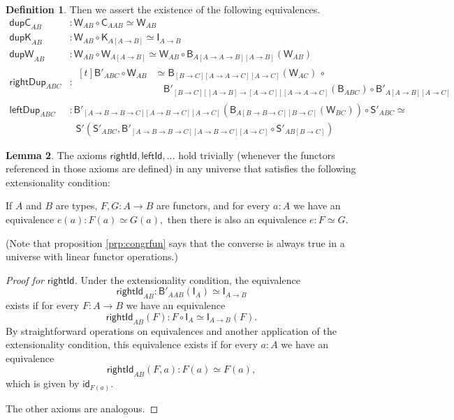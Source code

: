 \documentclass[a4paper]{article}
\theoremstyle{definition}
\newtheorem{definition}{Definition}[section]
\newtheorem{lemma}[definition]{Lemma}
\theoremstyle{remark}
\renewcommand{\equiv}{\simeq}
\newcommand{\nm}{\mathsf}
\newcommand{\id}{\nm{id}}
\newcommand{\combinator}{\nm}
\newcommand{\idFun}{\combinator{I}}
\newcommand{\constFun}{\combinator{K}}
\newcommand{\compFun}{\combinator{B'}}
\newcommand{\revCompFun}{\combinator{B}}
\newcommand{\swapFun}{\combinator{C}}
\newcommand{\dupFun}{\combinator{W}}
\newcommand{\substFun}{\combinator{S'}}
\begin{document}
\begin{definition}
  Then we assert the existence of the following equivalences.
  \begin{align*}
    \nm{dupC}_{AB}      &: \dupFun_{AB} \circ \swapFun_{AAB} \equiv \dupFun_{AB}\\
    \nm{dupK}_{AB}      &: \dupFun_{AB} \circ \constFun_{A[A{\to}B]} \equiv \idFun_{A{\to}B}\\
    \nm{dupW}_{AB}      &: \dupFun_{AB} \circ \dupFun_{A[A{\to}B]} \equiv \dupFun_{AB} \circ \revCompFun_{A[A{\to}A{\to}B][A{\to}B]}(\dupFun_{AB})\\
    \nm{rightDup}_{ABC} &: \begin{aligned}[t]\compFun_{ABC} \circ \dupFun_{AB} &\equiv \revCompFun_{[B{\to}C][A{\to}A{\to}C][A{\to}C]}(\dupFun_{AC})\,\circ\\
                                                                               &\ \ \ \ \compFun_{[B{\to}C][[A{\to}B]{\to}[A{\to}C]][A{\to}A{\to}C]}(\revCompFun_{ABC}) \circ \compFun_{A[A{\to}B][A{\to}C]}\end{aligned}\\
    \nm{leftDup}_{ABC}  &: \compFun_{[A{\to}B{\to}B{\to}C][A{\to}B{\to}C][A{\to}C]}(\revCompFun_{A[B{\to}B{\to}C][B{\to}C]}(\dupFun_{BC})) \circ \substFun_{ABC} \equiv\\
                        &\:\ \ \substFun(\substFun_{ABC},\compFun_{[A{\to}B{\to}B{\to}C][A{\to}B{\to}C][A{\to}C]} \circ \substFun_{AB[B{\to}C]})
  \end{align*}
\end{definition}

\begin{lemma}
  \label{lem:extensional}
  The axioms $\nm{rightId},\nm{leftId},\ldots$ hold trivially (whenever the functors
  referenced in those axioms are defined) in any universe that satisfies the following
  extensionality condition:

  If $A$ and $B$ are types, $F,G : A \to B$ are functors, and for every $a : A$ we have
  an equivalence $e(a) : F(a) \equiv G(a),$ then there is also an equivalence
  $e : F \equiv G.$
\end{lemma}

(Note that proposition \ref{prp:congrfun} says that the converse is always true in
a universe with linear functor operations.)

\begin{proof}[Proof for $\nm{rightId}$]
  Under the extensionality condition, the equivalence
  \[\nm{rightId}_{AB} : \compFun_{AAB}(\idFun_A) \equiv \idFun_{A{\to}B}\]
  exists if for every $F : A \to B$ we have an equivalence
  \[\nm{rightId}_{AB}(F) : F \circ \idFun_A \equiv \idFun_{A{\to}B}(F).\]
  By straightforward operations on equivalences and another application of the
  extensionality condition, this equivalence exists if for every $a : A$ we have an
  equivalence
  \[\nm{rightId}_{AB}(F,a) : F(a) \equiv F(a),\]
  which is given by $\id_{F(a)}.$

  The other axioms are analogous.
\end{proof}
\end{document}
